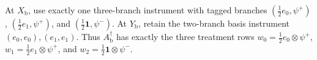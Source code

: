 At \(X_{\mathrm b}\), use exactly one three-branch instrument with tagged branches \((\tfrac12 e_0,\psi^{+})\), \((\tfrac12 e_1,\psi^{+})\), and \((\tfrac12\mathbf 1,\psi^{-})\). At \(Y_{\mathrm b}\), retain the two-branch basis instrument \((e_0,e_0),(e_1,e_1)\). Thus \(A_{\mathrm b}^{\dagger}\) has exactly the three treatment rows \(w_0=\tfrac12 e_0\otimes\psi^{+}\), \(w_1=\tfrac12 e_1\otimes\psi^{+}\), and \(w_2=\tfrac12\mathbf 1\otimes\psi^{-}\).